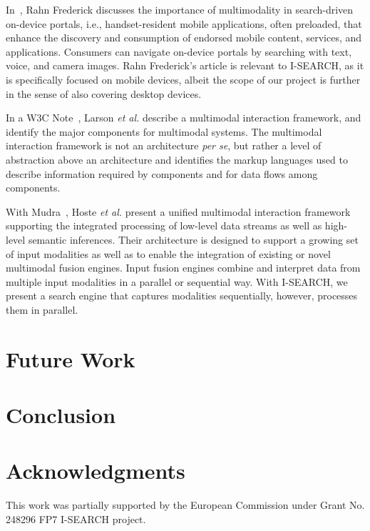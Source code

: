 \documentclass{acm_proc_article-sp}
\newcommand{\inlinelistingsize}{\fontsize{8pt}{11pt}}
\let\oldttdefault\ttdefault
\renewcommand{\ttdefault}{pcr}
\let\oldurl\url
\renewcommand{\url}[1]{\inlinelistingsize\oldurl{#1}}
\begin{document}
In~\cite{multimodalitysun}, Rahn Frederick discusses the importance of multimodality in search-driven on-device portals, i.e., handset-resident mobile applications, often preloaded, that enhance the discovery and consumption of endorsed mobile content, services, and applications.
Consumers can navigate on-device portals by searching with text, voice, and camera images.
Rahn Frederick's article is relevant to \mbox{I-SEARCH}, as it is specifically focused on mobile devices, albeit the scope of our project is further in the sense of also covering desktop devices. 

In a W3C Note~\cite{w3cmultimodal2003}, Larson \textit{et al.} describe a multimodal interaction framework, and identify the major components for multimodal systems.
The multimodal interaction framework is not an architecture \textit{per se}, but rather a level of abstraction above an architecture and identifies the markup languages used to describe information required by components and for data flows among components.

With Mudra~\cite{mudra2011}, Hoste \textit{et al.} present a unified multimodal interaction framework supporting the integrated processing of low-level data streams as well as high-level semantic inferences.
Their architecture is designed to support a growing set of input modalities as well as to enable the integration of existing or novel multimodal fusion engines.
Input fusion engines combine and interpret data from multiple input modalities in a parallel or sequential way.
With \mbox{I-SEARCH}, we present a search engine that captures modalities sequentially, however, processes them in parallel.

\section{Future Work} \label{sec:futurework}

\section{Conclusion} \label{sec:conclusion}


\section{Acknowledgments}
This work was partially supported by the European Commission under Grant No. 248296 FP7 \mbox{I-SEARCH} project.

\let\ttdefault\oldttdefault
\let\url\oldurl




\balancecolumns
\end{document}

